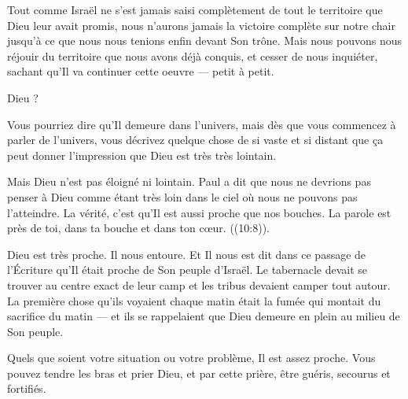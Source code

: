 Tout comme Israël ne s'est jamais saisi complètement
 de tout le territoire que Dieu leur avait promis,
 nous n'aurons jamais la victoire complète sur notre chair
 jusqu'à ce que nous nous tenions enfin devant Son trône.
 Mais nous pouvons nous réjouir du territoire que nous avons déjà conquis,
 et cesser de nous inquiéter, sachant qu'Il va continuer cette oeuvre
 --- petit à petit. 

\dvrule






 Dieu ?

Vous pourriez dire qu'Il demeure dans l'univers,
 mais dès que vous commencez à parler de l'univers,
 vous décrivez quelque chose de si vaste et si distant
 que ça peut donner l'impression que Dieu est très très lointain.

Mais Dieu n'est pas éloigné ni lointain.
 Paul a dit que nous ne devrions pas penser à Dieu comme étant très loin
 dans le ciel où nous ne pouvons pas l'atteindre.
 La vérité, c'est qu'Il est aussi proche que nos bouches.
 \og La parole est près de toi, dans ta bouche et dans ton cœur. \fg{}
 ((10:8)).

Dieu est très proche. Il nous entoure.
 Et Il nous est dit dans ce passage de l'Écriture
 qu'Il était proche de Son peuple d'Israël.
 Le tabernacle devait se trouver au centre exact de leur camp
 et les tribus devaient camper tout autour.
 La première chose qu'ils voyaient chaque matin était la fumée
 qui montait du sacrifice du matin
 --- et ils se rappelaient que Dieu demeure en plein au milieu de Son peuple.


Quels que soient votre situation ou votre problème, Il est assez proche.
 Vous pouvez tendre les bras et prier Dieu, et par cette prière,
 être guéris, secourus et fortifiés. 

